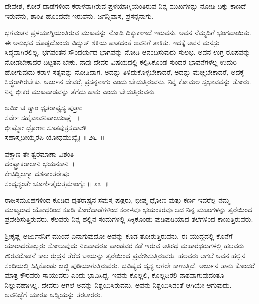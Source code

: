 \begin{artha}
ದೇವೇಶ, ಕೋರೆ ದಾಡೆಗಳಿಂದ ಕರಾಳವಾಗಿರುವ ಪ್ರಳಯಾಗ್ನಿಯಂತಿರುವ ನಿನ್ನ ಮುಖಗಳನ್ನು ನೋಡಿ ದಿಕ್ಕು ಕಾಣದೆ ಇರುವೆನು, ಶಾಂತಿ ಹೊಂದದೇ ಇರುವೆನು. ಜಗನ್ನಿವಾಸ, ಪ್ರಸನ್ನನಾಗು.
\end{artha}

ಭಗವಂತನ ಪ್ರಳಯಾಗ್ನಿಯಂತಿರುವ ಮುಖವನ್ನು ನೋಡಿ ದಿಕ್ಕುಕಾಣದೆ ಇರುವನು. ಅವನ ನೆಮ್ಮದಿಗೆ ಭಂಗವಾಯಿತು. ಈ ಅನುಭವ ದೊಡ್ಡದೊಂದು ವಿದ್ಯುತ್ ಶಕ್ತಿಯ ಪಾತದಂತೆ ಅವನಿಗೆ ತಾಕಿತು. ಇದಕ್ಕೆ ಅವನ ಮನಸ್ಸು ಸಿದ್ಧವಾಗಿರಲಿಲ್ಲ. ಭಗವಂತನ ಸೌಂದರ್ಯದ ಭಾಗವನ್ನು ನೋಡಿ ಆನಂದಿಸುವುದು ಸುಲಭ. ಅವನ ಉಗ್ರ ರೂಪವನ್ನು ನೋಡಬೇಕಾದರೆ ದಿಟ್ಟತನ ಬೇಕು. ನಾವು ದೇವರ ವಿಷಯದಲ್ಲಿ ಕಲ್ಪಿಸಿಕೊಂಡ ಸುಂದರ ಭಾವನೆಗಳೆಲ್ಲ ಉದುರಿ ಹೋಗುವುದು ಕರಾಳ ಸತ್ಯವನ್ನು ನೋಡಿದಾಗ. ಅದನ್ನು ತಿಳಿದುಕೊಳ್ಳಬೇಕಾದರೆ, ಅದನ್ನು ಮೆಚ್ಚಬೇಕಾದರೆ, ಅದಕ್ಕೆ ಸಿದ್ಧರಾಗಿರಬೇಕು. ಅರ್ಜುನ ದೇವರೆ, ಪ್ರಸನ್ನನಾಗು ಎಂದು ಬೇಡುತ್ತಿರುವನು. ನಿನ್ನ ಕೋಮಲ ಸ್ವಭಾವವನ್ನು ತೋರು. ನಿನ್ನ ಭೀಕರ ಮುಖವಾಡವನ್ನು ತೆಗೆದು ಹಾಕು ಎಂದು ಬೇಡುತ್ತಿರುವನು.

\begin{shloka}
ಅಮೀ ಚ ತ್ವಾಂ ಧೃತರಾಷ್ಟ್ರಸ್ಯ ಪುತ್ರಾಃ \\ ಸರ್ವೇ ಸಹೈವಾವನಿಪಾಲಸಂಘೈಃ~।\\ಭೀಷ್ಮೋ ದ್ರೋಣಃ ಸೂತಪುತ್ರಸ್ತಥಾಸೌ \\ ಸಹಾಸ್ಮದೀಯೈರಪಿ ಯೋಧಮುಖ್ಯೈಃ \hfill॥ ೨೬~॥
\end{shloka}

\begin{shloka}
ವಕ್ತ್ರಾಣಿ ತೇ ತ್ವರಮಾಣಾ ವಿಶಂತಿ \\ ದಂಷ್ಟ್ರಾಕರಾಲಾನಿ ಭಯನಕಾನಿ~।\\ಕೇಚಿದ್ವಿಲಗ್ನಾ ದಶನಾಂತರೇಷು \\ ಸಂದೃಶ್ಯಂತೇ ಚೂರ್ಣಿತೈರುತ್ತಮಾಂಗೈಃ \hfill॥ ೨೭~॥
\end{shloka}

\begin{artha}
ರಾಜಸಮೂಹಗಳಿಂದ ಕೂಡಿದ ಧೃತರಾಷ್ಟ್ರನ ಸಮಸ್ತ ಪುತ್ರರು, ಭೀಷ್ಮ ದ್ರೋಣ ಮತ್ತು ಕರ್ಣ ಇವರೆಲ್ಲ ನಮ್ಮ ಮುಖ್ಯರಾದ ಯೋಧರಿಂದ ಕೂಡಿ ಕೋರೆದಾಡೆಗಳಿಂದ ಕರಾಳವೂ ಭಯಂಕರವೂ ಆದ ನಿನ್ನ ಮುಖಗಳನ್ನು ತ್ವರೆಯಿಂದ ಪ್ರವೇಶಿಸುತ್ತಿರುವರು. ಕೆಲವರು ನಿನ್ನ ಹಲ್ಲಿನ ಸಂದುಗಳಲ್ಲಿ ಸಿಕ್ಕಿಕೊಂಡು ಪುಡಿಪುಡಿಯಾದ ತಲೆಗಳಿಂದ ಕಾಣುತ್ತಿರುವರು.
\end{artha}

ಶ‍್ರೀಕೃಷ್ಣ ಅರ್ಜುನನಿಗೆ ಮುಂದೆ ಏನಾಗುವುದೋ ಅವನ್ನು ಕೂಡ ತೋರುತ್ತಿರುವನು. ಈ ಯುದ್ಧದಲ್ಲಿ ಕೊನೆಗೆ ಯಾರಾದರೊಬ್ಬರು ಸೋಲುವುದು ನಿಜವಾದರೂ ಪಾಂಡವರ ಕಡೆ ಇರುವ ಅತಿರಥ ಮಹಾರಥರುಗಳಲ್ಲಿ ಹಲವರು ಕೌರವರೊಡನೆ ಕಾಲ ರುದ್ರನ ತೆರೆದ ಬಾಯನ್ನು ತ್ವರೆಯಿಂದ ಪ್ರವೇಶಿಸುತ್ತಿರುವರು. ಹಲವರು ಆಗಲೆ ಅವನ ಹಲ್ಲಿನ ಸಂದಿಯಲ್ಲಿ ಸಿಕ್ಕಿಕೊಂಡು ಜಜ್ಜಿ ಪುಡಿಯಾಗುತ್ತಿರುವರು. ಭವಿಷ್ಯದ ದೃಶ್ಯ ಆಗಲೇ ಕಾಣುತ್ತಿದೆ. ಅರ್ಜುನ ತಾನು ಕೊಂದರೆ ಮಾತ್ರ ಕೌರವರು ಸಾಯುವರು ಎಂದು ಭಾವಿಸಿದ್ದ. ಇವನು ಕೊಲ್ಲಲಿ, ಕೊಲ್ಲದಿರಲಿ ನಾಶವಾಗುವುದಂತೂ ನಿಲ್ಲುವಹಾಗಿಲ್ಲ. ದೇವರು ಆಗಲೆ ಅದನ್ನು ನಿಶ್ಚಯಿಸಿರುವನು. ಅವನು ನಿಶ್ಚಯಿಸಿದಂತೆ ಆಗಿಯೇ ಆಗುವುದು. ಅವನಿಚ್ಛೆಗೆ ಯಾರೂ ಅಡ್ಡಿಯನ್ನು ತರಲಾರರು.

